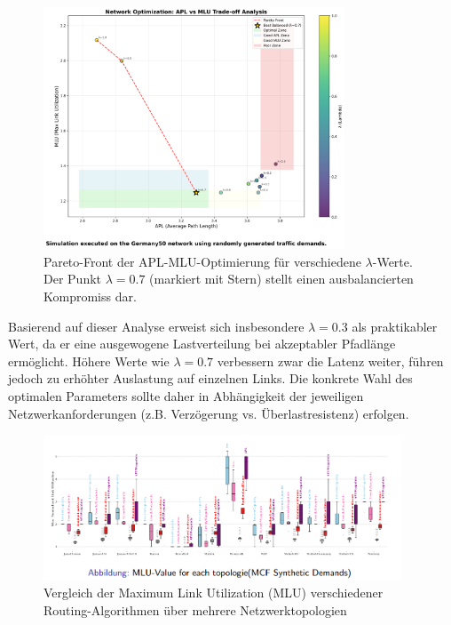 \begin{figure}[htbp]
    \centering
    \includegraphics[width=0.8\textwidth]{Report/bilder/pareto_apl_mlu.png}
    \caption{Pareto-Front der APL-MLU-Optimierung für verschiedene $\lambda$-Werte. Der Punkt $\lambda = 0.7$ (markiert mit Stern) stellt einen ausbalancierten Kompromiss dar.}
    \label{fig:pareto_apl_mlu}
\end{figure}

Basierend auf dieser Analyse erweist sich insbesondere $\lambda = 0.3$ als praktikabler Wert, da er eine ausgewogene Lastverteilung bei akzeptabler Pfadlänge ermöglicht. Höhere Werte wie $\lambda = 0.7$ verbessern zwar die Latenz weiter, führen jedoch zu erhöhter Auslastung auf einzelnen Links. Die konkrete Wahl des optimalen Parameters sollte daher in Abhängigkeit der jeweiligen Netzwerkanforderungen (z.B. Verzögerung vs. Überlastresistenz) erfolgen.
\begin{figure}[htbp]
    \centering
    \includegraphics[width=0.95\textwidth]{Report/bilder/mlu_comparison.png}
    \caption{Vergleich der Maximum Link Utilization (MLU) verschiedener Routing-Algorithmen über mehrere Netzwerktopologien }
    \label{fig:mlu_synthetic}
\end{figure}

